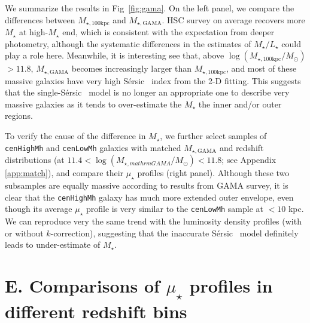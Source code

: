 \documentclass{emulateapj}
\def\ser{{S\'{e}rsic\ }}
\def\rbcg{\texttt{cenHighMh}}
\def\nbcg{\texttt{cenLowMh}}
\def\mstar{{$M_{\star}$}}
\def\mtot{{$M_{\star,100\mathrm{kpc}}$}}
\def\mgama{{$M_{\star,\mathrm{GAMA}}$}}
\def\logmtot{{$\log (M_{\star,100\mathrm{kpc}}/M_{\odot})$}}
\def\logmgama{{$\log (M_{\star,mathrm{GAMA}}/M_{\odot})$}}
\def\m2l{{$M_{\star}/L_{\star}$}}
\def\mden{{$\mu_{\star}$}}
\begin{document}
\begin{CJK*}{UTF8}{gbsn}
    We summarize the results in Fig~\ref{fig:gama}.  
    On the left panel, we compare the differences between \mtot{} and \mgama{}. 
    HSC survey on average recovers more \mstar{} at high-\mstar{} end, which is 
    consistent with the expectation from deeper photometry, although the 
    systematic differences in the estimates of \m2l{} could play a role here. 
    Meanwhile, it is interesting see that, above \logmtot{}$> 11.8$, \mgama{} 
    becomes increasingly larger than \mtot{}, and most of these massive 
    galaxies have very high \ser{} index from the 2-D fitting. 
    This suggests that the single-\ser{} model is no longer an appropriate one to 
    describe very massive galaxies as it tends to over-estimate the \mstar{} the 
    inner and/or outer regions. 
    
    To verify the cause of the difference in \mstar{}, we further select samples 
    of \rbcg{} and \nbcg{} galaxies with matched \mgama{} and redshift 
    distributions (at $11.4 <$\logmgama{}$<11.8$; see Appendix \ref{app:match}), 
    and compare their \mden{} profiles (right panel). 
    Although these two subsamples are equally massive according to results from 
    GAMA survey, it is clear that the \rbcg{} galaxy has much more extended 
    outer envelope, even though its average \mden{} profile is very similar 
    to the \nbcg{} sample at $< 10$ kpc. 
    We can reproduce very the same trend with the luminosity density profiles 
    (with or without $k$-correction), suggesting that the inaccurate \ser{} 
    model definitely leads to under-estimate of \mstar{}.  
 

\section{E. Comparisons of \mden{} profiles in different redshift bins}
    \label{app:redshift}


\end{CJK*}
\end{document}
